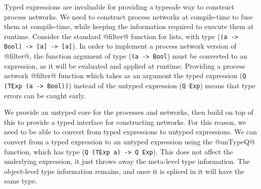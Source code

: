 Typed expressions are invaluable for providing a typesafe way to construct process networks.
We need to construct process networks at compile-time to fuse them at compile-time, while keeping the information required to execute them at runtime.
Consider the standard @filter@ function for lists, with type (\lstinline/(a -> Bool) -> [a] -> [a]/).
In order to implement a process network version of @filter@, the function argument of type (\lstinline/(a -> Bool/) must be converted to an expression, as it will be evaluated and applied at runtime.
Providing a process network @filter@ function which takes as an argument the typed expression (\lstinline/Q (TExp (a -> Bool))/) instead of the untyped expression (\lstinline/Q Exp/) means that type errors can be caught early.

We provide an untyped core for the processes and networks, then build on top of this to provide a typed interface for constructing networks.
For this reason, we need to be able to convert from typed expressions to untyped expressions.
We can convert from a typed expression to an untyped expression using the @unTypeQ@ function, which has type (\lstinline/Q (TExp a) -> Q Exp/).
This does not affect the underlying expression, it just throws away the meta-level type information.
The object-level type information remains, and once it is spliced in it will have the same type.

 



